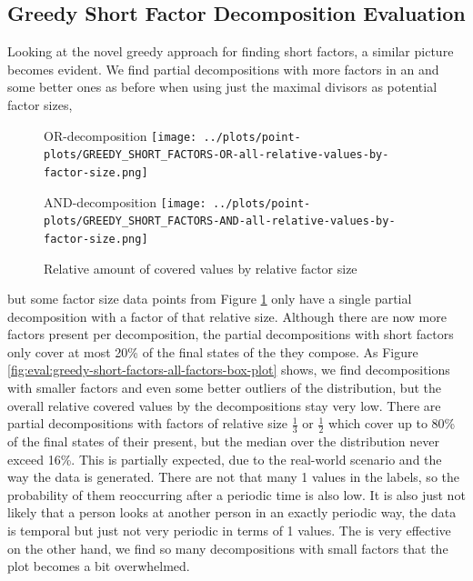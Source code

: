 \subsection{Greedy Short Factor Decomposition Evaluation}
\label{ch:Evaluation:decomposition-quality:greedy-short-factors}
Looking at the novel greedy approach for finding short factors, a similar picture becomes evident.
We find partial decompositions with more factors in an \orDecomp and some better ones as before when using just the maximal divisors as potential factor sizes,
\begin{figure}[h]
	\begin{minipage}[h]{0.49\linewidth}
		\centering
		OR-decomposition
		\texttt{[image: ../plots/point-plots/GREEDY\_SHORT\_FACTORS-OR-all-relative-values-by-factor-size.png]}
	\end{minipage}
	\begin{minipage}[h]{0.49\linewidth}
		\centering
		AND-decomposition
		\texttt{[image: ../plots/point-plots/GREEDY\_SHORT\_FACTORS-AND-all-relative-values-by-factor-size.png]}
	\end{minipage}
	\caption{Relative amount of covered values by relative factor size}
	\label{fig:eval:greedy-short-factors-all-factors}
\end{figure}
 but some factor size data points from Figure \ref{fig:eval:greedy-short-factors-all-factors} only have a single partial decomposition with a factor of that relative size.
Although there are now more factors present per decomposition, the partial decompositions with short factors only cover at most 20\% of the final states of the \DFA they compose.
As Figure \ref{fig:eval:greedy-short-factors-all-factors-box-plot} shows, we find decompositions with smaller factors and even some better outliers of the distribution, but the overall relative covered values by the decompositions stay very low.
There are partial decompositions with factors of relative size $\frac{1}{3}$ or $\frac{1}{2}$ which cover up to 80\% of the final states of their \DFA present, but the median over the distribution never exceed 16\%.
This is partially expected, due to the real-world scenario and the way the data is generated.
There are not that many 1 values in the labels, so the probability of them reoccurring after a periodic time is also low.
It is also just not likely that a person looks at another person in an exactly periodic way, the data is temporal but just not very periodic in terms of 1 values.
The \andDecomp is very effective on the other hand, we find so many decompositions with small factors that the plot becomes a bit overwhelmed.

